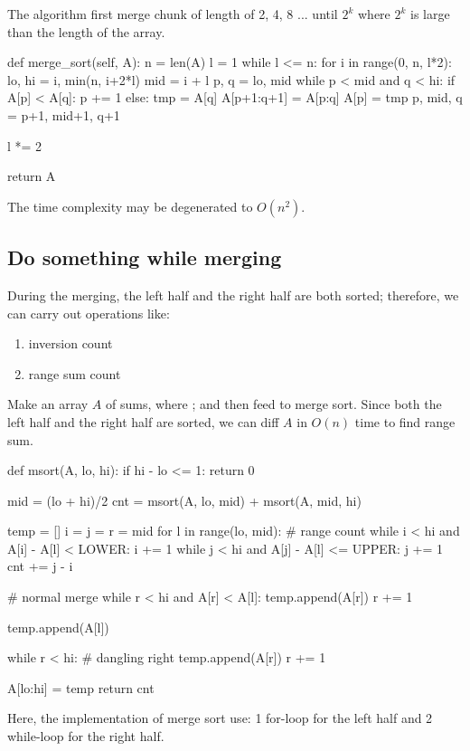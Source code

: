 The algorithm first merge chunk of length of 2, 4, 8 ... until $2^k$ where $2^k$ is large than the length of the array.
\begin{python}
def merge_sort(self, A):
  n = len(A)
  l = 1
  while l <= n:
    for i in range(0, n, l*2):
      lo, hi = i, min(n, i+2*l)
      mid = i + l
      p, q = lo, mid
      while p < mid and q < hi:
        if A[p] < A[q]:
          p += 1
        else:
          tmp = A[q]
          A[p+1:q+1] = A[p:q]
          A[p] = tmp
          p, mid, q = p+1, mid+1, q+1

    l *= 2

  return A
\end{python}
The time complexity may be degenerated to $O(n^2)$. 
\subsection{Do something while merging}
During the merging, the left half and the right half are both sorted; therefore, we can carry out operations like:
\begin{enumerate}
\item inversion count 
\item range sum count 
\end{enumerate}

 Make an array $A$ of sums, where ; and then feed to merge sort. Since both the left half and the right half are sorted, we can diff $A$ in $O(n)$ time to find range sum. 

\begin{python}
def msort(A, lo, hi):
  if hi - lo <= 1: return 0

  mid = (lo + hi)/2
  cnt = msort(A, lo, mid) + msort(A, mid, hi)

  temp = []
  i = j = r = mid
  for l in range(lo, mid):
    # range count
    while i < hi and A[i] - A[l] <  LOWER: i += 1
    while j < hi and A[j] - A[l] <= UPPER: j += 1
    cnt += j - i

    # normal merge 
    while r < hi and A[r] < A[l]:
      temp.append(A[r])
      r += 1

    temp.append(A[l])

  while r < hi:  # dangling right
    temp.append(A[r])
    r += 1

  A[lo:hi] = temp
  return cnt
\end{python}

Here, the implementation of merge sort use: 1 for-loop for the left half and 2 while-loop for the right half.


